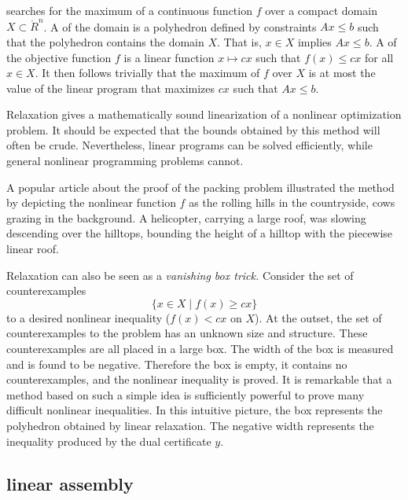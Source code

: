  searches for the maximum of a
continuous function $f$ over a compact domain $X\subset \ring{R}^n$.
A  of the domain is a polyhedron defined by
constraints $A x \le b$ such that the polyhedron contains the domain
$X$.  That is, $x\in X$ implies $A x \le b$.  A  of the objective function $f$ is a linear function
$x\mapsto c x$ such that $f(x) \le c x$ for all $x\in X$.  It then
follows trivially that the maximum of $f$ over $X$ is at most the
value of the linear program that maximizes $c x$ such that $A x \le
b$.

Relaxation gives a mathematically sound linearization of a
nonlinear optimization problem.  It should be expected that the bounds
obtained by this method will often be crude.  Nevertheless, linear
programs can be solved efficiently, while general nonlinear
programming problems cannot.

\begin{remark}[popularization]
A popular article about the proof of the packing problem
illustrated the method by depicting the nonlinear function $f$
as the rolling hills in the countryside, cows grazing in the background.  
A helicopter,
carrying a large roof, was slowing
descending over the hilltops, bounding the height of a hilltop
with the piecewise linear roof.
\end{remark}

\begin{remark}
Relaxation can also be seen as a {\it vanishing
box trick.}  Consider the set of counterexamples
\[
\{x\in X\mid f(x)\ge c x\}
\]
to a desired nonlinear inequality ($f(x)< c x$ on $X$).  At the
outset, the set of counterexamples to the problem has an unknown size
and structure.  These counterexamples are all placed in a large box.
The width of the box is measured and is found to be negative.
Therefore the box is empty, it contains no counterexamples, and the
nonlinear inequality is proved.  It is remarkable that a method based
on such a simple idea is sufficiently powerful to prove many difficult
nonlinear inequalities.  In this intuitive picture, the box represents
the polyhedron obtained by linear relaxation.  The negative width
represents the inequality produced by the dual certificate $y$.
\end{remark}

\subsection{linear assembly}

